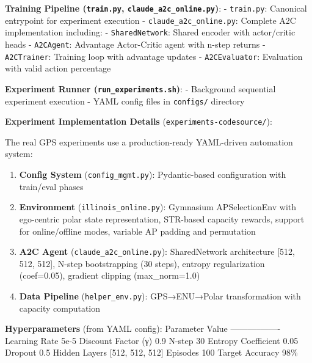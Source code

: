 \documentclass[
  10pt,
  twocolumn,
]{article}
\providecommand{\tightlist}{%
  \setlength{\itemsep}{0pt}\setlength{\parskip}{0pt}}
\begin{document}
\textbf{Training Pipeline (\texttt{train.py},
	\texttt{claude\_a2c\_online.py})}: - \texttt{train.py}: Canonical
entrypoint for experiment execution - \texttt{claude\_a2c\_online.py}:
Complete A2C implementation including: - \texttt{SharedNetwork}: Shared
encoder with actor/critic heads - \texttt{A2CAgent}: Advantage
Actor-Critic agent with n-step returns - \texttt{A2CTrainer}: Training
loop with advantage updates - \texttt{A2CEvaluator}: Evaluation with
valid action percentage

\textbf{Experiment Runner (\texttt{run\_experiments.sh})}: - Background
sequential experiment execution - YAML config files in \texttt{configs/}
directory

\textbf{Experiment Implementation Details}
(\texttt{experiments-codesource/}):

The real GPS experiments use a production-ready YAML-driven automation
system:

\begin{enumerate}
	\def\labelenumi{\arabic{enumi}.}
	\tightlist
	\item
	      \textbf{Config System} (\texttt{config\_mgmt.py}): Pydantic-based
	      configuration with train/eval phases
	\item
	      \textbf{Environment} (\texttt{illinois\_online.py}): Gymnasium
	      APSelectionEnv with ego-centric polar state representation, STR-based
	      capacity rewards, support for online/offline modes, variable AP
	      padding and permutation
	\item
	      \textbf{A2C Agent} (\texttt{claude\_a2c\_online.py}): SharedNetwork
	      architecture {[}512, 512, 512{]}, N-step bootstrapping (30 steps),
	      entropy regularization (coef=0.05), gradient clipping (max\_norm=1.0)
	\item
	      \textbf{Data Pipeline} (\texttt{helper\_env.py}): GPS→ENU→Polar
	      transformation with capacity computation
\end{enumerate}

\textbf{Hyperparameters} (from YAML config): \textbar{} Parameter
\textbar{} Value \textbar{} \textbar-----------\textbar-------\textbar{}
\textbar{} Learning Rate \textbar{} 5e-5 \textbar{} \textbar{} Discount
Factor (γ) \textbar{} 0.9 \textbar{} \textbar{} N-step \textbar{} 30
\textbar{} \textbar{} Entropy Coefficient \textbar{} 0.05 \textbar{}
\textbar{} Dropout \textbar{} 0.5 \textbar{} \textbar{} Hidden Layers
\textbar{} {[}512, 512, 512{]} \textbar{} \textbar{} Episodes \textbar{}
100 \textbar{} \textbar{} Target Accuracy \textbar{} 98\% \textbar{}
\end{document}
